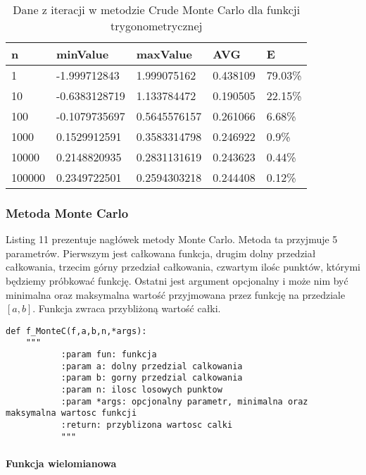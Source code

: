 \documentclass[12pt,twoside]{article}
\begin{document}
\begin{table}[H]
\centering 
\caption{Dane z iteracji w metodzie Crude Monte Carlo dla funkcji trygonometrycznej}
\label{tabela6.2}
\begin{tabular}{lllll}
\toprule
n &  minValue &  maxValue &       AVG &      E \\
\midrule
1 & -1.999712843 &   1.999075162 & 0.438109 & 79.03\% \\
10 & -0.6383128719 &  1.133784472 & 0.190505 & 22.15\% \\
100 & -0.1079735697 &  0.5645576157 & 0.261066 & 6.68\% \\
1000 & 0.1529912591 &   0.3583314798 & 0.246922 & 0.9\% \\
10000 & 0.2148820935 &  0.2831131619 & 0.243623 & 0.44\% \\
100000 & 0.2349722501 &  0.2594303218 & 0.244408 & 0.12\% \\
\bottomrule
\end{tabular}
\end{table}


\subsubsection{Metoda Monte Carlo}
Listing 11 prezentuje nagłówek metody Monte Carlo. Metoda ta przyjmuje 5 parametrów. Pierwszym jest całkowana funkcja, drugim dolny przedział całkowania, trzecim górny przedział całkowania, czwartym ilośc punktów, którymi będziemy próbkować funkcję. Ostatni jest argument opcjonalny i może nim być minimalna oraz maksymalna wartość przyjmowana przez funkcję na przedziale $[a,b]$. Funkcja zwraca przybliżoną wartość całki.

\begin{lstlisting}[caption={Kod w języku python implementujący metodę Monte Carlo}]
    def f_MonteC(f,a,b,n,*args):
    """
           :param fun: funkcja
           :param a: dolny przedzial calkowania
           :param b: gorny przedzial calkowania
           :param n: ilosc losowych punktow
           :param *args: opcjonalny parametr, minimalna oraz maksymalna wartosc funkcji
           :return: przyblizona wartosc calki
           """
\end{lstlisting}
\label{Listing 11}

\paragraph{Funkcja wielomianowa}\mbox{} \\
\end{document}
